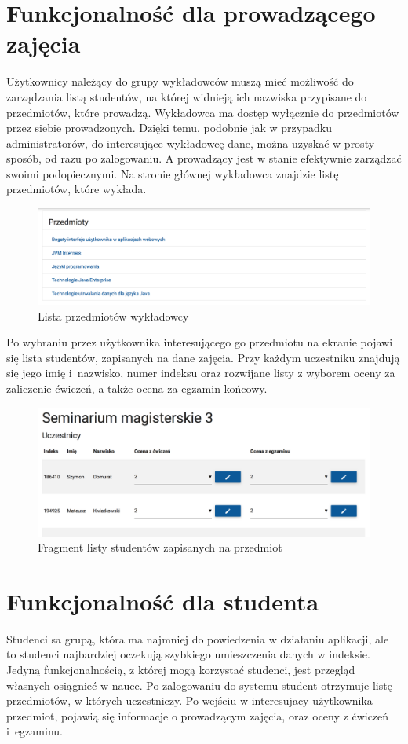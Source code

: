 \documentclass[openright]{xmgr}
\begin{document}
\section{Funkcjonalność dla prowadzącego zajęcia}

\indent \indent \indent Użytkownicy należący do grupy wykładowców muszą mieć możliwość do zarządzania listą studentów, na której widnieją ich nazwiska przypisane do przedmiotów, które prowadzą. Wykładowca ma dostęp wyłącznie do przedmiotów przez siebie prowadzonych. Dzięki temu, podobnie jak w przypadku administratorów, do interesujące wykładowcę dane, można uzyskać w prosty sposób, od razu po zalogowaniu. A prowadzący jest w stanie efektywnie zarządzać swoimi podopiecznymi. Na stronie głównej wykładowca znajdzie listę przedmiotów, które wykłada.

\begin{figure}[th!]
\centering
\includegraphics[width=0.7\hsize]{images/subjectList}
\caption{Lista przedmiotów wykładowcy\label{RYS.10}}
\end{figure}

\noindent Po wybraniu przez użytkownika interesującego go przedmiotu na ekranie pojawi się lista studentów,  zapisanych na dane zajęcia. Przy każdym uczestniku znajdują się jego imię i~nazwisko, numer indeksu oraz rozwijane listy z wyborem oceny za zaliczenie ćwiczeń, a także ocena za egzamin końcowy.

\begin{figure}[th!]
\centering
\includegraphics[width=0.7\hsize]{images/studentList}
\caption{Fragment listy studentów zapisanych na przedmiot\label{RYS.11}}
\end{figure}

\section{Funkcjonalność dla studenta}
\indent \indent \indent Studenci sa grupą, która ma najmniej do powiedzenia w działaniu aplikacji, ale to studenci najbardziej oczekują szybkiego umieszczenia danych w indeksie. Jedyną funkcjonalnością, z której mogą korzystać studenci, jest przegląd własnych osiągnieć w nauce. Po zalogowaniu do systemu student otrzymuje listę przedmiotów, w których uczestniczy. Po wejściu w interesujacy użytkownika przedmiot, pojawią się informacje o prowadzącym zajęcia, oraz oceny z ćwiczeń i~egzaminu.
\end{document}
